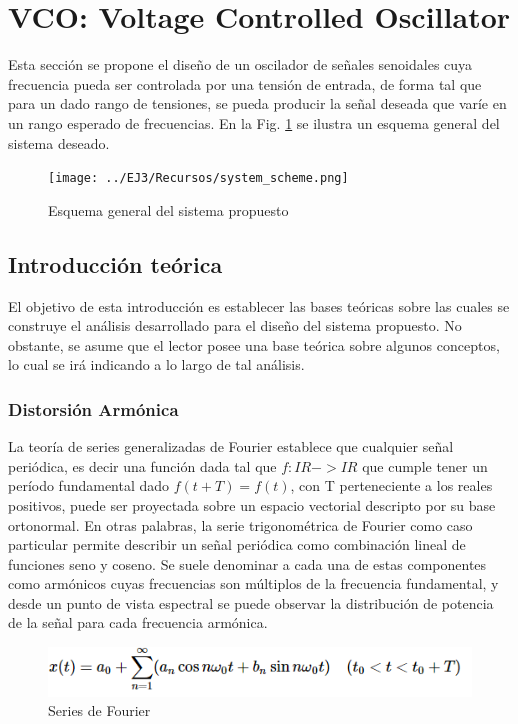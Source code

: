 \section{VCO: Voltage Controlled Oscillator}
Esta secci\'on se propone el dise\~no de un oscilador de se\~nales senoidales cuya frecuencia pueda ser controlada por una tensi\'on de entrada,
de forma tal que para un dado rango de tensiones, se pueda producir la se\~nal deseada que var\'ie en un rango esperado de frecuencias.
En la Fig. \ref{fig:esquema_general_ejercicio_3} se ilustra un esquema general del sistema deseado.

\begin{figure}[H]
    \centering
    \texttt{[image: ../EJ3/Recursos/system\_scheme.png]}
    \caption{Esquema general del sistema propuesto}
    \label{fig:esquema_general_ejercicio_3}
\end{figure}


\subsection{Introducci\'on te\'orica}
El objetivo de esta introducci\'on es establecer las bases te\'oricas sobre las cuales se construye
el an\'alisis desarrollado para el dise\~no del sistema propuesto. No obstante, se asume que el lector posee
una base te\'orica sobre algunos conceptos, lo cual se ir\'a indicando a lo largo de tal an\'alisis.

\subsubsection{Distorsi\'on Arm\'onica}
La teor\'ia de series generalizadas de Fourier establece que cualquier se\~nal peri\'odica, es decir una funci\'on dada tal que
$f: I\!R -> I\!R$ que cumple tener un per\'iodo fundamental dado $f(t + T) = f(t)$, con T perteneciente a los reales positivos, puede
ser proyectada sobre un espacio vectorial descripto por su base ortonormal.
En otras palabras, la serie trigonométrica de Fourier como caso particular permite describir un se\~nal peri\'odica como combinaci\'on 
lineal de funciones seno y coseno. Se suele denominar a cada una de estas componentes como arm\'onicos cuyas frecuencias son m\'ultiplos de la 
frecuencia fundamental, y desde un punto de vista espectral se puede observar la distribuci\'on de potencia de la se\~nal para cada frecuencia
arm\'onica.

\begin{figure}[H]
    \centering
    \includegraphics[scale=0.6]{../EJ3/Recursos/fourier_series.PNG}
    \caption{Series de Fourier}
\end{figure}


